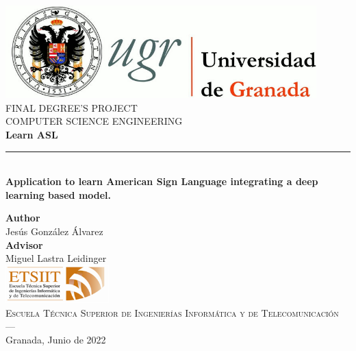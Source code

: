 \begin{titlepage}
\newlength{\centeroffset}
\setlength{\centeroffset}{-0.5\oddsidemargin}
\addtolength{\centeroffset}{0.5\evensidemargin}
\thispagestyle{empty}

\noindent\hspace*{\centeroffset}\begin{minipage}{\textwidth}

\centering
\includegraphics[width=0.9\textwidth]{logos/logo_ugr.jpg}\\[1.4cm]

\textsc{ \Large FINAL DEGREE'S PROJECT\\[0.2cm]}
\textsc{ COMPUTER SCIENCE ENGINEERING}\\[1cm]

{\Huge\bfseries Learn ASL \\}
\noindent\rule[-1ex]{\textwidth}{3pt}\\[3.5ex]
{\large\bfseries Application to learn American Sign Language integrating a deep learning based model. }
\end{minipage}

\vspace{2.5cm}
\noindent\hspace*{\centeroffset}
\begin{minipage}{\textwidth}
\centering

\textbf{Author}\\ {Jesús González Álvarez}\\[2.5ex]
\textbf{Advisor}\\ {Miguel Lastra Leidinger}\\[2cm]
\includegraphics[width=0.3\textwidth]{logos/etsiit_logo.png}\\[0.1cm]
\textsc{Escuela Técnica Superior de Ingenierías Informática y de Telecomunicación}\\
\textsc{---}\\
Granada, Junio de 2022
\end{minipage}
\end{titlepage}

